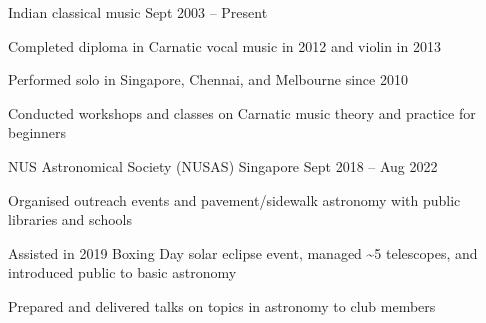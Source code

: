 \begin{cventries}
	{Indian classical music} %
	{} %
	{Sept 2003 -- Present} %
	{
		\begin{cvitems} %
			\item Completed diploma in Carnatic vocal music in 2012 and violin in 2013
			\item Performed solo in Singapore, Chennai, and Melbourne since 2010
			\item Conducted workshops and classes on Carnatic music theory and practice for beginners
		\end{cvitems}
	}

	{NUS Astronomical Society (NUSAS)} %
	{Singapore} %
	{Sept 2018 -- Aug 2022} %
	{
		\begin{cvitems} %
			\item Organised outreach events and pavement/sidewalk astronomy with public libraries and schools
			\item Assisted in 2019 Boxing Day solar eclipse event, managed \textasciitilde5 telescopes, and introduced public to basic astronomy
			\item Prepared and delivered talks on topics in astronomy to club members
		\end{cvitems}
	}

\end{cventries}
